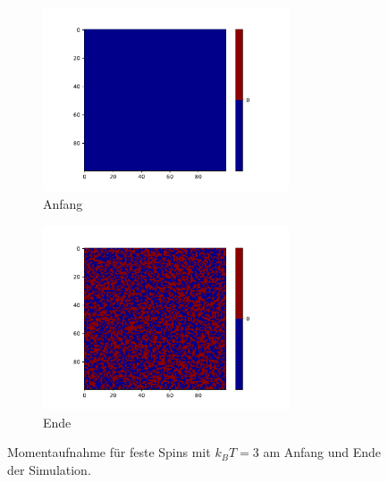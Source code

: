 \begin{figure}
  \begin{subfigure}{0.48\textwidth}
    \includegraphics[width = 0.8\textwidth]{A2/build/3kbt-a-fest_anfang.pdf}
    \caption{Anfang}
  \end{subfigure}
  \begin{subfigure}{0.48\textwidth}
    \includegraphics[width = 0.8\textwidth]{A2/build/3kbt-a-fest_ende.pdf}
    \caption{Ende}
  \end{subfigure}
  \caption{Momentaufnahme für feste Spins mit $k_B T = 3$ am Anfang und Ende der Simulation.}
  \label{fig:fixThree}
\end{figure}

